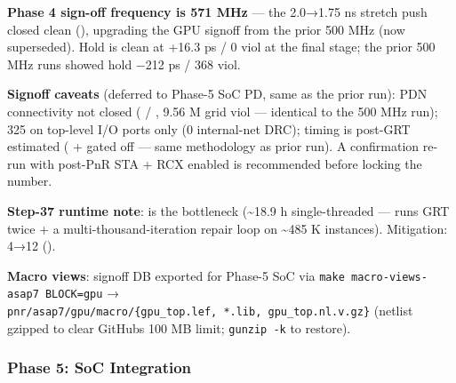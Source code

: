 \begin{record}
\textbf{Phase 4 sign-off frequency is 571 MHz} --- the
 2.0→1.75 ns stretch push closed clean
(), upgrading the GPU signoff from the
prior 500 MHz  (now superseded). Hold is
clean at +16.3 ps / 0 viol at the final stage; the prior 500 MHz
run\textquotesingle s  showed hold −212 ps /
368 viol.

\textbf{Signoff caveats} (deferred to Phase-5 SoC PD, same as the prior
run): PDN connectivity not closed ( / ,
9.56 M grid viol --- identical to the 500 MHz run); 325 
on top-level I/O ports only (0 internal-net DRC); timing is post-GRT
estimated ( +  gated off --- same methodology
as prior run). A confirmation re-run with post-PnR STA + RCX enabled is
recommended before locking the number.

\textbf{Step-37 runtime note}:  is the
bottleneck (\textasciitilde18.9 h single-threaded --- runs GRT twice + a
multi-thousand-iteration repair loop on \textasciitilde485 K instances).
Mitigation:  4→12 ().

\textbf{Macro views}: signoff DB exported for Phase-5 SoC via
\texttt{make\ macro-\allowbreak{}views-\allowbreak{}asap7\ BLOCK=\allowbreak{}gpu}
→
\texttt{pnr/\allowbreak{}asap7/\allowbreak{}gpu/\allowbreak{}macro/\allowbreak{}\{gpu\_\allowbreak{}top.\allowbreak{}lef,\allowbreak{}\ *.\allowbreak{}lib,\allowbreak{}\ gpu\_\allowbreak{}top.\allowbreak{}nl.\allowbreak{}v.\allowbreak{}gz\}}
(netlist gzipped to clear GitHub\textquotesingle s 100 MB limit;
\texttt{gunzip\ -\allowbreak{}k} to restore).

\end{record}

\subsubsection{\texorpdfstring{Phase 5: SoC Integration
\ok{}}{Phase 5: SoC Integration }}\label{cr:status:phase-status:phase-5-soc-integration-white-check-mark}

